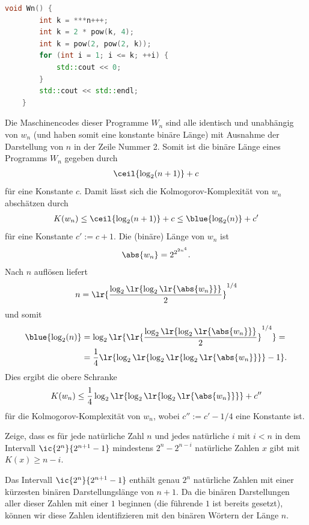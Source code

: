 \begin{questions}
\begin{solution}
\begin{lstlisting}[language=C++,caption=$W_n$]
    void Wn() {
        int k = ***n+++;
        int k = 2 * pow(k, 4);
        int k = pow(2, pow(2, k));
        for (int i = 1; i <= k; ++i) {
            std::cout << 0;
        }
        std::cout << std::endl;
    }
\end{lstlisting}
		Die Maschinencodes dieser Programme $W_n$ sind alle identisch und unabhängig von $w_n$ (und haben somit eine konstante binäre Länge) mit Ausnahme der Darstellung von $n$ in der Zeile Nummer 2. Somit ist die binäre Länge eines Programms $W_n$ gegeben durch
		\begin{align*}
			\ceil{\log_2(n+1)} + c
		\end{align*}
		für eine Konstante $c$. Damit lässt sich die Kolmogorov-Komplexität von $w_n$ abschätzen durch
		\begin{align*}
			K(w_n) \leq \ceil{\log_2(n+1)} + c \leq \blue{\log_2(n)} + c'
		\end{align*}
		für eine Konstante $c' := c + 1$. Die (binäre) Länge von $w_n$ ist
		\begin{align*}
			\abs{w_n} = 2^{2^{2n^4}}.
		\end{align*}
		Nach $n$ auflösen liefert
		\begin{align*}
			n = \lr{\frac{\log_2\lr{\log_2\lr{\abs{w_n}}}}{2}}^{1/4}
		\end{align*}
		und somit
		\begin{align*}
			\blue{\log_2(n)} & = \log_2\lr{\lr{\frac{\log_2\lr{\log_2\lr{\abs{w_n}}}}{2}}^{1/4}} = \\
			                 & = \frac{1}{4}\lr{\log_2\lr{\log_2\lr{\log_2\lr{\abs{w_n}}}}-1}.
		\end{align*}
		Dies ergibt die obere Schranke
		\begin{align*}
			K(w_n) \leq \frac{1}{4}\log_2\lr{\log_2\lr{\log_2\lr{\abs{w_n}}}} + c''
		\end{align*}
		für die Kolmogorov-Komplexität von $w_n$, wobei $c'':=c'-1/4$ eine Konstante ist.
	\end{solution}

	\question[1] Zeige, dass es für jede natürliche Zahl $n$ und jedes natürliche $i$ mit $i<n$ in dem Intervall $\ic{2^n}{2^{n+1} - 1}$ mindestens $2^n - 2^{n-i}$ natürliche Zahlen $x$ gibt mit $K(x) \geq n-i$.
	\begin{solution}
		Das Intervall $\ic{2^n}{2^{n+1} - 1}$ enthält genau $2^n$ natürliche Zahlen mit einer kürzesten binären Darstellungslänge von $n + 1$.
		Da die binären Darstellungen aller dieser Zahlen mit einer $1$ beginnen (die führende $1$ ist bereits gesetzt), können wir diese Zahlen identifizieren mit den binären Wörtern der Länge $n$.


\end{solution}
\end{questions}
